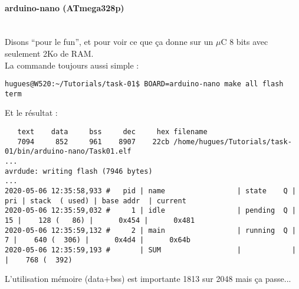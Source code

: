 \paragraph{arduino-nano (ATmega328p)}~\\

Disons \enquote{pour le fun}, et pour voir ce que ça donne sur un $\mu$C
8 bits avec seulement 2Ko de RAM.\\

La commande toujours aussi simple :
{\scriptsize
\begin{verbatim}
hugues@W520:~/Tutorials/task-01$ BOARD=arduino-nano make all flash term
\end{verbatim}
}
Et le résultat :
{\scriptsize
\begin{verbatim}
   text	   data	    bss	    dec	    hex	filename
   7094	    852	    961	   8907	   22cb	/home/hugues/Tutorials/task-01/bin/arduino-nano/Task01.elf
...
avrdude: writing flash (7946 bytes)
...
2020-05-06 12:35:58,933 # 	pid | name                 | state    Q | pri | stack  ( used) | base addr  | current     
2020-05-06 12:35:59,032 # 	  1 | idle                 | pending  Q |  15 |    128 (   86) |      0x454 |      0x481 
2020-05-06 12:35:59,132 # 	  2 | main                 | running  Q |   7 |    640 (  306) |      0x4d4 |      0x64b 
2020-05-06 12:35:59,193 # 	    | SUM                  |            |     |    768 (  392)
\end{verbatim}
}
L'utilisation mémoire (data+bss) est importante 1813 sur 2048 mais ça
passe...
